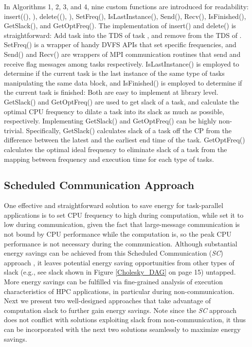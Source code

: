 \documentclass[12pt]{elsarticle}
\begin{document}
In Algorithms 1, 2, 3, and 4, nine custom functions are introduced for readability: \textsf{insert((), )}, \textsf{delete((), )}, \textsf{SetFreq()}, \textsf{IsLastInstance()}, \textsf{Send()}, \textsf{Recv()}, \textsf{IsFinished()}, \textsf{GetSlack()}, and \textsf{GetOptFreq()}. The implementation of \textsf{insert()} and \textsf{delete()} is straightforward: Add task  into the TDS of task , and remove  from the TDS of . \textsf{SetFreq()} is a wrapper of handy DVFS APIs that set specific frequencies, and \textsf{Send()} and \textsf{Recv()} are wrappers of MPI communication routines that send and receive flag messages among tasks respectively. \textsf{IsLastInstance()} is employed to determine if the current task is the last instance of the same type of tasks manipulating the same data block, and \textsf{IsFinished()} is employed to determine if the current task is finished: Both are easy to implement at library level. \textsf{GetSlack()} and \textsf{GetOptFreq()} are used to get slack of a task, and calculate the optimal CPU frequency to dilate a task into its slack as much as possible, respectively. Implementing \textsf{GetSlack()} and \textsf{GetOptFreq()} can be highly non-trivial. Specifically, \textsf{GetSlack()} calculates slack of a task off the CP from the difference between the latest and the earliest end time of the task. \textsf{GetOptFreq()} calculates the optimal ideal frequency to eliminate slack of a task from the mapping between frequency and execution time for each type of tasks.

\subsection{Scheduled Communication Approach}

One effective and straightforward solution to save energy for task-parallel applications is to set CPU frequency to high during computation, while set it to low during communication, given the fact that large-message communication is not bound by CPU performance while the computation is, so the peak CPU performance is not necessary during the communication. Although substantial energy savings can be achieved from this Scheduled Communication (\emph{SC}) approach \cite{sc06} \cite{sc07}, it leaves potential energy saving opportunities from other types of slack (e.g., see slack shown in Figure \ref{Cholesky_DAG} on page 15) untapped. More energy savings can be fulfilled via fine-grained analysis of execution characteristics of HPC applications, in particular during non-communication. Next we present two well-designed approaches that take advantage of computation slack to further gain energy savings. Note since the \emph{SC} approach does not conflict with solutions exploiting slack from non-communication, it thus can be incorporated with the next two solutions seamlessly to maximize energy savings.
\end{document}
